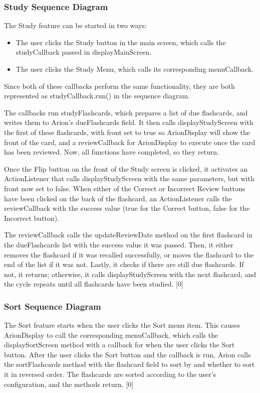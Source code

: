 \documentclass{scrreprt}
\begin{document}
\subsubsection*{Study Sequence Diagram}
\noindent
The Study feature can be started in two ways:
\begin{itemize}
    \item The user clicks the Study button in the main screen, which calls the studyCallback passed in displayMainScreen.
    \item The user clicks the Study Menu, which calls its corresponding menuCallback.
\end{itemize}
Since both of these callbacks perform the same functionality,
    they are both represented as studyCallback.run() in the sequence diagram.
    
The callbacks run studyFlashcards, which prepares a list of due flashcards, and writes them to Arion's dueFlashcards field.
It then calls displayStudyScreen with the first of these flashcards, with
    front set to true so ArionDisplay will show the front of the card, 
    and a reviewCallback for ArionDisplay to execute once the card has been reviewed.
Now, all functions have completed, so they return.

Once the Flip button on the front of the Study screen is clicked,
it activates an ActionListener that calls displayStudyScreen with the same parameters, but with front now set to false.
When either of the Correct or Incorrect Review buttons have been clicked on the back of the flashcard,
    an ActionListener calls the reviewCallback with the success value (true for the Correct button, false for the Incorrect button).
    
The reviewCallback calls the updateReviewDate method on the first flashcard in the dueFlashcards list with the success value it was passed.
Then, it either removes the flashcard if it was recalled successfully, or moves the flashcard to the end of the list if it was not.
Lastly, it checks if there are still due flashcards.
If not, it returns; otherwise, it calls displayStudyScreen with the next flashcard, and the cycle repeats until all flashcards have been studied.
[0]

\subsubsection*{Sort Sequence Diagram}
The Sort feature starts when the user clicks the Sort menu item.
This causes ArionDisplay to call the corresponding menuCallback,
    which calls the displaySortScreen method with a callback for when the user clicks the Sort button.
After the user clicks the Sort button and the callback is run,
    Arion calls the sortFlashcards method with the flashcard field to sort by and whether to sort it in reversed order.
The flashcards are sorted according to the user's configuration, and the methods return.
[0]
\end{document}
